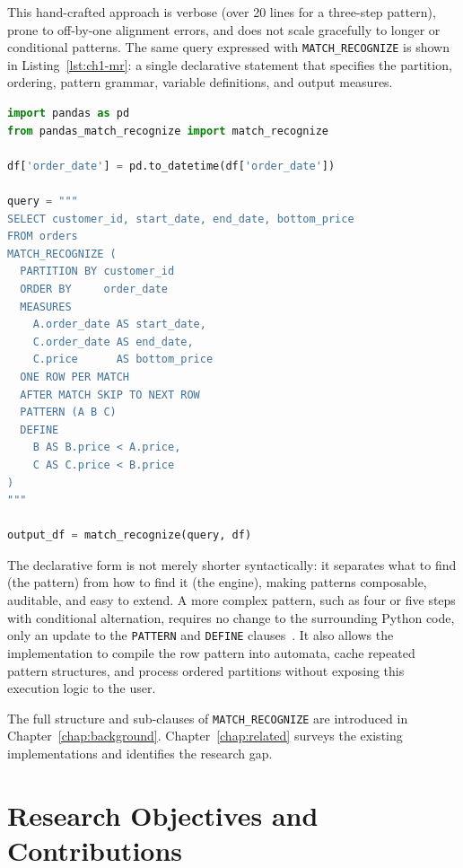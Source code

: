 This hand-crafted approach is verbose (over 20 lines for a
three-step pattern), prone to off-by-one alignment errors,
and does not scale gracefully to longer or conditional patterns.
The same query expressed with \texttt{MATCH\_RECOGNIZE} is shown
in Listing~\ref{lst:ch1-mr}: a single declarative statement that
specifies the partition, ordering, pattern grammar, variable definitions, and output measures.

\begin{lstlisting}[language=Python,
    caption={The same pattern expressed with \texttt{MATCH\_RECOGNIZE}
             on a Pandas DataFrame},
    label={lst:ch1-mr}]
import pandas as pd
from pandas_match_recognize import match_recognize

df['order_date'] = pd.to_datetime(df['order_date'])

query = """
SELECT customer_id, start_date, end_date, bottom_price
FROM orders
MATCH_RECOGNIZE (
  PARTITION BY customer_id
  ORDER BY     order_date
  MEASURES
    A.order_date AS start_date,
    C.order_date AS end_date,
    C.price      AS bottom_price
  ONE ROW PER MATCH
  AFTER MATCH SKIP TO NEXT ROW
  PATTERN (A B C)
  DEFINE
    B AS B.price < A.price,
    C AS C.price < B.price
)
"""

output_df = match_recognize(query, df)
\end{lstlisting}

The declarative form is not merely shorter syntactically: it
separates what to find (the pattern) from how to
find it (the engine), making patterns composable, auditable, and
easy to extend.  A more complex pattern, such as four or five steps
with conditional alternation, requires no change to the surrounding
Python code, only an update to the \texttt{PATTERN} and
\texttt{DEFINE} clauses~\cite{michels2018new,petkovic2022rpr}.
It also allows the implementation to compile the row pattern into
automata, cache repeated pattern structures, and process ordered
partitions without exposing this execution logic to the user.

The full structure and sub-clauses of \texttt{MATCH\_RECOGNIZE}
are introduced in Chapter~\ref{chap:background}.  Chapter~\ref{chap:related}
surveys the existing implementations and identifies the research
gap.

\section{Research Objectives and Contributions}
\label{sec:intro-objectives}

